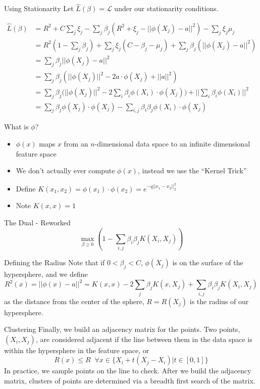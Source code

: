 \documentclass{beamer}
\begin{document}
\begin{frame}{Using Stationarity}
    Let $\hat{L}(\beta) = \mathcal{L}$ under our stationarity conditions.

\begin{align*}
    \hat{L}(\beta)&= R^2 + C\sum_{j} \xi_j - \sum_j\beta_j( R^2 + \xi_j-||\phi(X_j) - a||^2) - \sum_{j} \xi_j  \mu_j \nonumber\\
    &= R^2 (1-\sum_j\beta_j) + \sum_{j} \xi_j(C-\beta_j-\mu_j) + \sum_j\beta_j(||\phi(X_j) - a||^2)\nonumber\\
    &=\sum_j\beta_j||\phi(X_j)- a||^2 \nonumber\\
    &=\sum_j \beta_j(||\phi(X_j)||^2 - 2 a \cdot \phi(X_j) + ||a||^2)\nonumber\\
    &= \sum_j \beta_j\Big(||\phi(X_j)||^2 - 2 \sum_i\beta_i\phi(X_i) \cdot \phi(X_j)\Big) + ||\sum_i\beta_i\phi(X_i)||^2 \nonumber\\
    & = \sum_j\beta_j \phi(X_j)\cdot \phi(X_j)  - \sum_{i,j}\beta_i\beta_j \phi(X_i)\cdot \phi(X_j) 
\end{align*}
\end{frame}
\begin{frame}{What is $\phi$?}
    \begin{itemize}
        \item $\phi(x)$ maps $x$ from an $n$-dimensional data space to an infinite dimensional feature space
        \item We don't actually ever compute $\phi(x)$, instead we use the ``Kernel Trick''
        \item Define $K(x_1,x_2) = \phi(x_1)\cdot \phi(x_2)= e^{-q||x_1-x_2||_2^2}$
        \item Note $K(x,x) = 1$
    \end{itemize}
\end{frame}
\begin{frame}{The Dual - Reworked}
    \begin{equation*}
    \label{eq:dual}
    \max_{\beta\geq 0} \left(1 - \sum_{i,j}\beta_i\beta_j K(X_i,X_j)\right)
\end{equation*}
\end{frame}
\begin{frame}{Defining the Radius}
Note that if $0<\beta_j<C$, $\phi(X_j)$ is on the surface of the hypersphere, and we define \[R^2(x)=||\phi(x)-a||^2=K(x,x) - 2 \sum_j \beta_j K(x,X_j)+\sum_{i,j}\beta_i \beta_j K(X_i,X_j)\]as the distance from the center of the sphere, $R = R(X_j)$ is the radius of our hypersphere.
\end{frame}
\begin{frame}{Clustering}
Finally, we build an adjacency matrix for the points. Two points, $(X_i,X_j)$, are considered adjacent if the line between them in the data space is within the hypersphere in the feature space, or \[R(x) \leq R \;\;\forall x\in\{X_i + t(X_j-X_i)|t\in[0,1]\}\]
In practice, we sample points on the line to check. After we build the adjacency matrix, clusters of points are determined via a breadth first search of the matrix. 
\end{frame}
\end{document}
